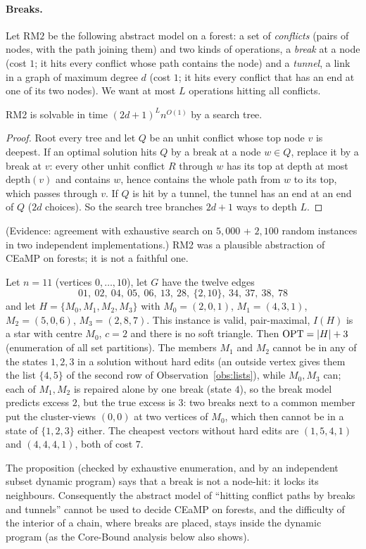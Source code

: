 \paragraph{Breaks.} Let $\mathrm{RM2}$ be the following abstract model on a forest: a set of \emph{conflicts} (pairs of nodes, with the path joining them) and two kinds of operations, a \emph{break} at a node (cost $1$; it hits every conflict whose path contains the node) and a \emph{tunnel}, a link in a graph of maximum degree $d$ (cost $1$; it hits every conflict that has an end at one of its two nodes). We want at most $L$ operations hitting all conflicts.
\begin{proposition}\label{prop:RM2}
RM2 is solvable in time $(2d+1)^{L}n^{O(1)}$ by a search tree.
\end{proposition}
\begin{proof}
Root every tree and let $Q$ be an unhit conflict whose top node $v$ is deepest. If an optimal solution hits $Q$ by a break at a node $w\in Q$, replace it by a break at $v$: every other unhit conflict $R$ through $w$ has its top at depth at most $\mathrm{depth}(v)$ and contains $w$, hence contains the whole path from $w$ to its top, which passes through $v$. If $Q$ is hit by a tunnel, the tunnel has an end at an end of $Q$ ($2d$ choices). So the search tree branches $2d+1$ ways to depth $L$.
\end{proof}
(Evidence: agreement with exhaustive search on $5{,}000$ + $2{,}100$ random instances in two independent implementations.) RM2 was a plausible abstraction of CEaMP on forests; it is not a faithful one.
\begin{proposition}\label{prop:hub}
Let $n=11$ (vertices $0,\dots,10$), let $G$ have the twelve edges
\[01,\ 02,\ 04,\ 05,\ 06,\ 13,\ 28,\ \{2,10\},\ 34,\ 37,\ 38,\ 78\]
and let $H=\{M_0,M_1,M_2,M_3\}$ with $M_0=(2,0,1)$, $M_1=(4,3,1)$, $M_2=(5,0,6)$, $M_3=(2,8,7)$. This instance is valid, pair-maximal, $I(H)$ is a star with centre $M_0$, $c=2$ and there is no soft triangle. Then $\mathrm{OPT}=|H|+3$ (enumeration of all set partitions). The members $M_1$ and $M_2$ cannot be in any of the states $1,2,3$ in a solution without hard edits (an outside vertex gives them the list $\{4,5\}$ of the second row of Observation~\ref{obs:lists}), while $M_0,M_3$ can; each of $M_1,M_2$ is repaired alone by one break (state $4$), so the break model predicts excess $2$, but the true excess is $3$: two breaks next to a common member put the cluster-views $(0,0)$ at two vertices of $M_0$, which then cannot be in a state of $\{1,2,3\}$ either. The cheapest vectors without hard edits are $(1,5,4,1)$ and $(4,4,4,1)$, both of cost $7$.
\end{proposition}
The proposition (checked by exhaustive enumeration, and by an independent subset dynamic program) says that a break is not a node-hit: it locks its neighbours. Consequently the abstract model of ``hitting conflict paths by breaks and tunnels'' cannot be used to decide CEaMP on forests, and the difficulty of the interior of a chain, where breaks are placed, stays inside the dynamic program (as the Core-Bound analysis below also shows).

